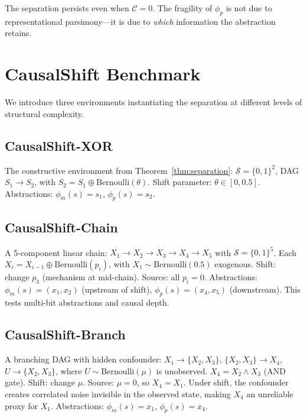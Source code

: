 \documentclass[runningheads]{llncs}
\newcommand{\phim}{\phi_m}
\newcommand{\phip}{\phi_p}
\newcommand{\Scal}{\mathcal{S}}
\begin{document}
\begin{corollary}
\label{cor:zero-cost}
The separation persists even when $\mathcal{C} = 0$. The fragility of $\phip$ is not due to representational parsimony---it is due to \emph{which} information the abstraction retains.
\end{corollary}

\section{CausalShift Benchmark}
\label{sec:benchmark}

We introduce three environments instantiating the separation at different levels of structural complexity.

\subsection{CausalShift-XOR}

The constructive environment from Theorem~\ref{thm:separation}: $\Scal = \{0,1\}^2$, DAG $S_1 \to S_2$, with $S_2 = S_1 \oplus \mathrm{Bernoulli}(\theta)$. Shift parameter: $\theta \in [0, 0.5]$. Abstractions: $\phim(s) = s_1$, $\phip(s) = s_2$.

\subsection{CausalShift-Chain}

A 5-component linear chain: $X_1 \to X_2 \to X_3 \to X_4 \to X_5$ with $\Scal = \{0,1\}^5$. Each $X_i = X_{i-1} \oplus \mathrm{Bernoulli}(p_i)$, with $X_1 \sim \mathrm{Bernoulli}(0.5)$ exogenous. Shift: change $p_3$ (mechanism at mid-chain). Source: all $p_i = 0$. Abstractions: $\phim(s) = (x_1, x_2)$ (upstream of shift), $\phip(s) = (x_4, x_5)$ (downstream). This tests multi-bit abstractions and causal depth.

\subsection{CausalShift-Branch}

A branching DAG with hidden confounder: $X_1 \to \{X_2, X_3\}$, $\{X_2, X_3\} \to X_4$, $U \to \{X_2, X_3\}$, where $U \sim \mathrm{Bernoulli}(\mu)$ is unobserved. $X_4 = X_2 \wedge X_3$ (AND gate). Shift: change $\mu$. Source: $\mu = 0$, so $X_4 = X_1$. Under shift, the confounder creates correlated noise invisible in the observed state, making $X_4$ an unreliable proxy for $X_1$. Abstractions: $\phim(s) = x_1$, $\phip(s) = x_4$.
\end{document}
